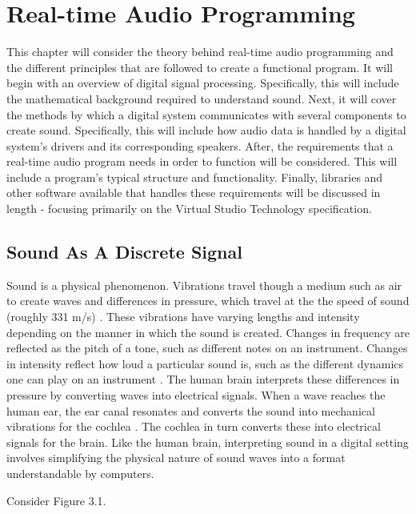 \chapter{Real-time Audio Programming}
\hspace*{-0.15cm}This chapter will consider the theory behind real-time audio programming and the different principles that are followed to create a functional program. It will begin with an overview of digital signal processing. Specifically, this will include the mathematical background required to understand sound. Next, it will cover the methods by which a digital system communicates with several components to create sound. Specifically, this will include how audio data is handled by a digital system's drivers and its corresponding speakers. After, the requirements that a real-time audio program needs in order to function will be considered. This will include a program's typical structure and functionality. Finally, libraries and other software available that handles these requirements will be discussed in length - focusing primarily on the Virtual Studio Technology specification.

\section{Sound As A Discrete Signal}
Sound is a physical phenomenon. Vibrations travel though a medium such as air to create waves and differences in pressure, which travel at the the speed of sound (roughly 331 m/s) \cite{Ling_2016}. These vibrations have varying lengths and intensity depending on the manner in which the sound is created. Changes in frequency are reflected as the pitch of a tone, such as different notes on an instrument. Changes in intensity reflect how loud a particular sound is, such as the different dynamics one can play on an instrument \cite{Ling_2016}. The human brain interprets these differences in pressure by converting waves into electrical signals. When a wave reaches the human ear, the ear canal resonates and converts the sound into mechanical vibrations for the cochlea \cite{Ling_2016}. The cochlea in turn converts these into electrical signals for the brain. Like the human brain, interpreting sound in a digital setting involves simplifying the physical nature of sound waves into a format understandable by computers.

Consider Figure 3.1.


